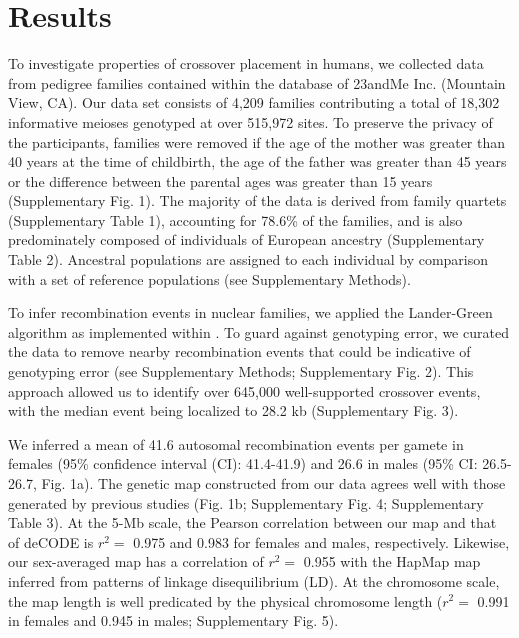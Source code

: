 \section{Results}

To investigate properties of crossover placement in humans, we
collected data from pedigree families contained within the
database of 23andMe Inc. (Mountain View, CA). Our data set
consists of 4,209 families contributing a total of 18,302
informative meioses genotyped at over 515,972 sites. To preserve
the privacy of the participants, families were removed if the age of
the mother was greater than 40 years at the time of childbirth,
the age of the father was greater than 45 years or the difference
between the parental ages was greater than 15 years
(Supplementary Fig. 1). The majority of the data is derived from
family quartets (Supplementary Table 1), accounting for 78.6\% of
the families, and is also predominately composed of individuals of
European ancestry (Supplementary Table 2). Ancestral populations
are assigned to each individual by comparison with a set of
reference populations (see Supplementary Methods).

To infer recombination events in nuclear families, we applied
the Lander-Green algorithm as implemented within \citet{Abecasis2002}.
To guard against genotyping error, we curated the data to remove
nearby recombination events that could be indicative of
genotyping error (see Supplementary Methods; Supplementary
Fig. 2). This approach allowed us to identify over 645,000 
well-supported crossover events, with the median event being localized
to 28.2 kb (Supplementary Fig. 3).

We inferred a mean of 41.6 autosomal recombination events
per gamete in females (95\% confidence interval (CI): 41.4-41.9)
and 26.6 in males (95\% CI: 26.5-26.7, Fig. 1a). The genetic map
constructed from our data agrees well with those generated by
previous studies (Fig. 1b; Supplementary Fig. 4; Supplementary
Table 3). At the 5-Mb scale, the Pearson correlation between our
map and that of deCODE\cite{Kong2010} is $r^2=$ 0.975 and 0.983 for females and
males, respectively. Likewise, our sex-averaged map has a
correlation of $r^2=$ 0.955 with the HapMap map inferred from
patterns of linkage disequilibrium (LD)\cite{hapmap2007}. At the chromosome
scale, the map length is well predicated by the physical
chromosome length ($r^2=$ 0.991 in females and 0.945 in males;
Supplementary Fig. 5).

